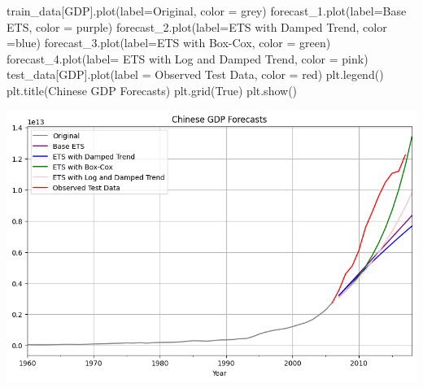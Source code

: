 \documentclass[
  11pt,
]{article}
\newenvironment{Shaded}{\begin{snugshade}}{\end{snugshade}}
\newcommand{\NormalTok}[1]{\textcolor[rgb]{0.00,0.23,0.31}{#1}}
\newcommand{\OperatorTok}[1]{\textcolor[rgb]{0.37,0.37,0.37}{#1}}
\newcommand{\StringTok}[1]{\textcolor[rgb]{0.13,0.47,0.30}{#1}}
\newcommand{\VariableTok}[1]{\textcolor[rgb]{0.07,0.07,0.07}{#1}}
\begin{document}
\begin{Shaded}
\begin{Highlighting}[]
\NormalTok{train\_data[}\StringTok{\textquotesingle{}GDP\textquotesingle{}}\NormalTok{].plot(label}\OperatorTok{=}\StringTok{\textquotesingle{}Original\textquotesingle{}}\NormalTok{, color }\OperatorTok{=} \StringTok{\textquotesingle{}grey\textquotesingle{}}\NormalTok{)}
\NormalTok{forecast\_1.plot(label}\OperatorTok{=}\StringTok{\textquotesingle{}Base ETS\textquotesingle{}}\NormalTok{, color }\OperatorTok{=} \StringTok{\textquotesingle{}purple\textquotesingle{}}\NormalTok{)}
\NormalTok{forecast\_2.plot(label}\OperatorTok{=}\StringTok{\textquotesingle{}ETS with Damped Trend\textquotesingle{}}\NormalTok{, color }\OperatorTok{=}\StringTok{\textquotesingle{}blue\textquotesingle{}}\NormalTok{)}
\NormalTok{forecast\_3.plot(label}\OperatorTok{=}\StringTok{\textquotesingle{}ETS with Box{-}Cox\textquotesingle{}}\NormalTok{, color }\OperatorTok{=} \StringTok{\textquotesingle{}green\textquotesingle{}}\NormalTok{)}
\NormalTok{forecast\_4.plot(label}\OperatorTok{=} \StringTok{\textquotesingle{}ETS with Log and Damped Trend\textquotesingle{}}\NormalTok{, color }\OperatorTok{=} \StringTok{\textquotesingle{}pink\textquotesingle{}}\NormalTok{)}
\NormalTok{test\_data[}\StringTok{\textquotesingle{}GDP\textquotesingle{}}\NormalTok{].plot(label }\OperatorTok{=} \StringTok{\textquotesingle{}Observed Test Data\textquotesingle{}}\NormalTok{, color }\OperatorTok{=} \StringTok{\textquotesingle{}red\textquotesingle{}}\NormalTok{)}
\NormalTok{plt.legend()}
\NormalTok{plt.title(}\StringTok{\textquotesingle{}Chinese GDP Forecasts\textquotesingle{}}\NormalTok{)}
\NormalTok{plt.grid(}\VariableTok{True}\NormalTok{)}
\NormalTok{plt.show()}
\end{Highlighting}
\end{Shaded}

\includegraphics{hw5_files/figure-pdf/cell-34-output-1.png}
\end{document}
